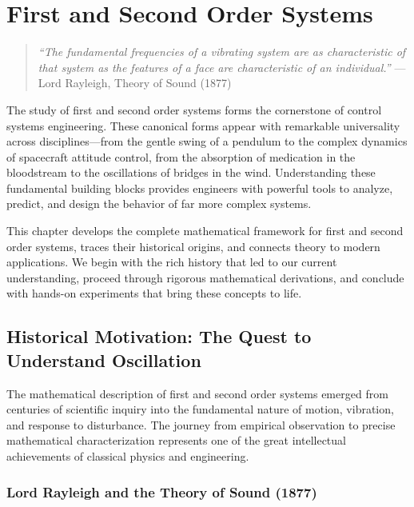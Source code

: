 
\setcounter{chapter}{4}
\chapter{First and Second Order Systems}

\begin{quote}
\textit{``The fundamental frequencies of a vibrating system are as characteristic of that system as the features of a face are characteristic of an individual.''} --- Lord Rayleigh, Theory of Sound (1877)
\end{quote}

\vspace{1em}

The study of first and second order systems forms the cornerstone of control systems engineering. These canonical forms appear with remarkable universality across disciplines---from the gentle swing of a pendulum to the complex dynamics of spacecraft attitude control, from the absorption of medication in the bloodstream to the oscillations of bridges in the wind. Understanding these fundamental building blocks provides engineers with powerful tools to analyze, predict, and design the behavior of far more complex systems.

This chapter develops the complete mathematical framework for first and second order systems, traces their historical origins, and connects theory to modern applications. We begin with the rich history that led to our current understanding, proceed through rigorous mathematical derivations, and conclude with hands-on experiments that bring these concepts to life.

\section{Historical Motivation: The Quest to Understand Oscillation}

The mathematical description of first and second order systems emerged from centuries of scientific inquiry into the fundamental nature of motion, vibration, and response to disturbance. The journey from empirical observation to precise mathematical characterization represents one of the great intellectual achievements of classical physics and engineering.

\subsection{Lord Rayleigh and the Theory of Sound (1877)}


